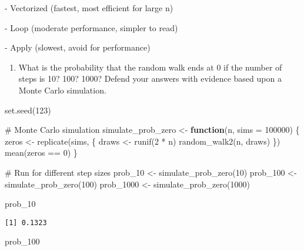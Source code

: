 \documentclass[
  letterpaper,
  DIV=11,
  numbers=noendperiod]{scrartcl}
\newenvironment{Shaded}{\begin{snugshade}}{\end{snugshade}}
\newcommand{\AttributeTok}[1]{\textcolor[rgb]{0.40,0.45,0.13}{#1}}
\newcommand{\CommentTok}[1]{\textcolor[rgb]{0.37,0.37,0.37}{#1}}
\newcommand{\ControlFlowTok}[1]{\textcolor[rgb]{0.00,0.23,0.31}{\textbf{#1}}}
\newcommand{\DecValTok}[1]{\textcolor[rgb]{0.68,0.00,0.00}{#1}}
\newcommand{\FunctionTok}[1]{\textcolor[rgb]{0.28,0.35,0.67}{#1}}
\newcommand{\NormalTok}[1]{\textcolor[rgb]{0.00,0.23,0.31}{#1}}
\newcommand{\OtherTok}[1]{\textcolor[rgb]{0.00,0.23,0.31}{#1}}
\newcommand{\SpecialCharTok}[1]{\textcolor[rgb]{0.37,0.37,0.37}{#1}}
\providecommand{\tightlist}{%
  \setlength{\itemsep}{0pt}\setlength{\parskip}{0pt}}
\begin{document}
- Vectorized (fastest, most efficient for large n)

- Loop (moderate performance, simpler to read)

- Apply (slowest, avoid for performance)

\begin{enumerate}
\def\labelenumi{\arabic{enumi}.}
\setcounter{enumi}{3}
\tightlist
\item
  What is the probability that the random walk ends at 0 if the number
  of steps is 10? 100? 1000? Defend your answers with evidence based
  upon a Monte Carlo simulation.
\end{enumerate}

\begin{Shaded}
\begin{Highlighting}[]
\FunctionTok{set.seed}\NormalTok{(}\DecValTok{123}\NormalTok{)}

\CommentTok{\# Monte Carlo simulation}
\NormalTok{simulate\_prob\_zero }\OtherTok{\textless{}{-}} \ControlFlowTok{function}\NormalTok{(n, }\AttributeTok{sims =} \DecValTok{100000}\NormalTok{) \{}
\NormalTok{  zeros }\OtherTok{\textless{}{-}} \FunctionTok{replicate}\NormalTok{(sims, \{}
\NormalTok{    draws }\OtherTok{\textless{}{-}} \FunctionTok{runif}\NormalTok{(}\DecValTok{2} \SpecialCharTok{*}\NormalTok{ n)}
    \FunctionTok{random\_walk2}\NormalTok{(n, draws)}
\NormalTok{  \})}
  \FunctionTok{mean}\NormalTok{(zeros }\SpecialCharTok{==} \DecValTok{0}\NormalTok{)}
\NormalTok{\}}

\CommentTok{\# Run for different step sizes}
\NormalTok{prob\_10   }\OtherTok{\textless{}{-}} \FunctionTok{simulate\_prob\_zero}\NormalTok{(}\DecValTok{10}\NormalTok{)}
\NormalTok{prob\_100  }\OtherTok{\textless{}{-}} \FunctionTok{simulate\_prob\_zero}\NormalTok{(}\DecValTok{100}\NormalTok{)}
\NormalTok{prob\_1000 }\OtherTok{\textless{}{-}} \FunctionTok{simulate\_prob\_zero}\NormalTok{(}\DecValTok{1000}\NormalTok{)}

\NormalTok{prob\_10}
\end{Highlighting}
\end{Shaded}

\begin{verbatim}
[1] 0.1323
\end{verbatim}

\begin{Shaded}
\begin{Highlighting}[]
\NormalTok{prob\_100}
\end{Highlighting}
\end{Shaded}
\end{document}
